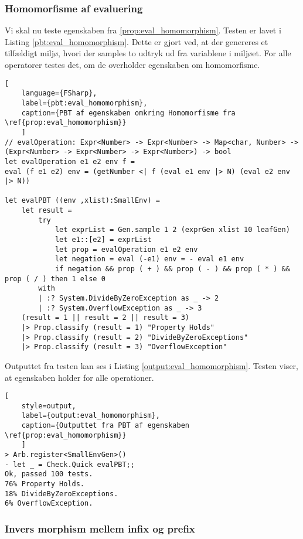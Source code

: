\subsubsection{Homomorfisme af evaluering}\label{sec:PBT_eval_homomorphism}

Vi skal nu teste egenskaben fra \ref{prop:eval_homomorphism}. Testen er lavet i Listing \ref{pbt:eval_homomorphism}. Dette er gjort ved, at der genereres et tilfældigt miljø, hvori der samples to udtryk ud fra variablene i miljøet. For alle operatorer testes det, om de overholder egenskaben om homomorfisme.


\begin{lstlisting}[
    language={FSharp}, 
    label={pbt:eval_homomorphism}, 
    caption={PBT af egenskaben omkring Homomorfisme fra \ref{prop:eval_homomorphism}}
    ]
// evalOperation: Expr<Number> -> Expr<Number> -> Map<char, Number> -> (Expr<Number> -> Expr<Number> -> Expr<Number>) -> bool
let evalOperation e1 e2 env f =
eval (f e1 e2) env = (getNumber <| f (eval e1 env |> N) (eval e2 env |> N))
 
let evalPBT ((env ,xlist):SmallEnv) = 
    let result = 
        try
            let exprList = Gen.sample 1 2 (exprGen xlist 10 leafGen)
            let e1::[e2] = exprList
            let prop = evalOperation e1 e2 env
            let negation = eval (-e1) env = - eval e1 env
            if negation && prop ( + ) && prop ( - ) && prop ( * ) && prop ( / ) then 1 else 0
        with
        | :? System.DivideByZeroException as _ -> 2
        | :? System.OverflowException as _ -> 3
    (result = 1 || result = 2 || result = 3)
    |> Prop.classify (result = 1) "Property Holds"
    |> Prop.classify (result = 2) "DivideByZeroExceptions"
    |> Prop.classify (result = 3) "OverflowException"    
\end{lstlisting}

Outputtet fra testen kan ses i Listing \ref{output:eval_homomorphism}. Testen viser, at egenskaben holder for alle operationer.

\begin{lstlisting}[
    style=output, 
    label={output:eval_homomorphism}, 
    caption={Outputtet fra PBT af egenskaben \ref{prop:eval_homomorphism}}
    ]
> Arb.register<SmallEnvGen>()
- let _ = Check.Quick evalPBT;;
Ok, passed 100 tests.
76% Property Holds.
18% DivideByZeroExceptions.
6% OverflowException.
\end{lstlisting}

\subsubsection{Invers morphism mellem infix og prefix}\label{sec:PBT_infix_prefix}
